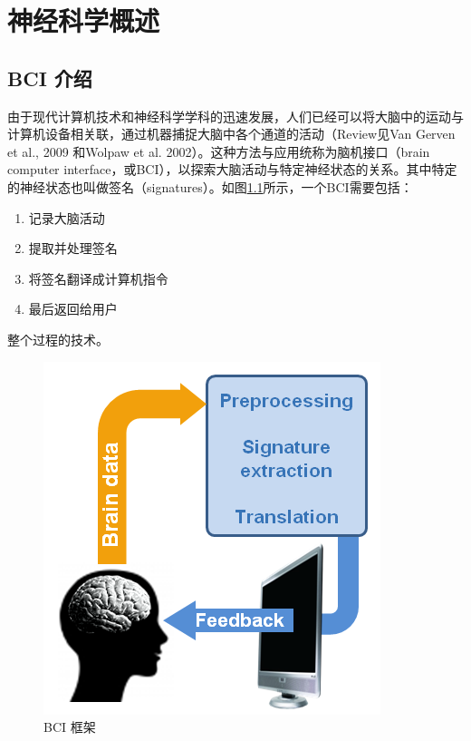 \chapter{神经科学概述}

\section{BCI 介绍}

由于现代计算机技术和神经科学学科的迅速发展，人们已经可以将大脑中的运动与计算机设备相关联，通过机器捕捉大脑中各个通道的活动（Review见Van Gerven et al., 2009 和Wolpaw et al. 2002）。这种方法与应用统称为脑机接口（brain computer interface，或BCI），以探索大脑活动与特定神经状态的关系。其中特定的神经状态也叫做签名（signatures）。如图\ref{Fig:bci_brief}所示，一个BCI需要包括：
\begin{enumerate}
\item{记录大脑活动}
\item{提取并处理签名}
\item{将签名翻译成计算机指令}
\item{最后返回给用户}
\end{enumerate}

整个过程的技术。

\begin{figure}[htb]
\centering
\includegraphics[scale=0.8]{Pictures/Chap1/bci_cycle_v2-2.png}
\caption{BCI 框架}
\label{Fig:bci_brief}
\end{figure}













